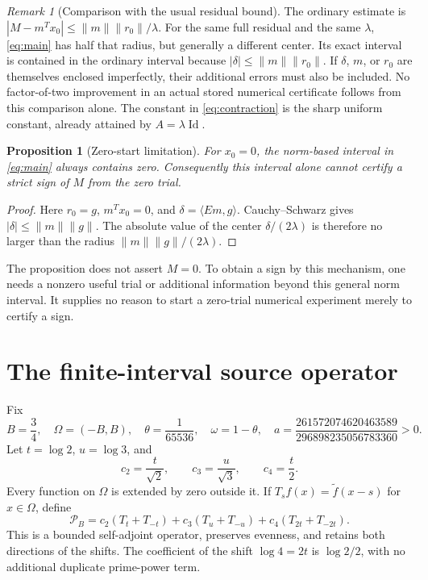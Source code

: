 \documentclass[11pt,a4paper]{article}
\newcommand{\Id}{\operatorname{Id}}
\newcommand{\ip}[2]{\langle #1,#2\rangle}
\newcommand{\norm}[1]{\lVert #1\rVert}
\newcommand{\Pp}{\mathcal P_B}
\newtheorem{proposition}[theorem]{Proposition}
\theoremstyle{remark}
\newtheorem{remark}[theorem]{Remark}
\numberwithin{equation}{section}
\begin{document}
\begin{remark}[Comparison with the usual residual bound]\label{rem:comparison}
The ordinary estimate is
$|M-m^Tx_0|\le\norm{m}\norm{r_0}/\lambda$.
For the same full residual and the same $\lambda$, \eqref{eq:main} has half
that radius, but generally a different center. Its exact interval is
contained in the ordinary interval because
$|\delta|\le\norm{m}\norm{r_0}$. If $\delta$, $m$, or $r_0$ are themselves
enclosed imperfectly, their additional errors must also be included. No
factor-of-two improvement in an actual stored numerical certificate follows
from this comparison alone. The constant in \eqref{eq:contraction} is the
sharp uniform constant, already attained by $A=\lambda\Id$.
\end{remark}

\begin{proposition}[Zero-start limitation]\label{prop:zero-start}
For $x_0=0$, the norm-based interval in \eqref{eq:main} always contains zero.
Consequently this interval alone cannot certify a strict sign of $M$ from
the zero trial.
\end{proposition}
\begin{proof}
Here $r_0=g$, $m^Tx_0=0$, and $\delta=\ip{Em}{g}$. Cauchy--Schwarz gives
$|\delta|\le\norm{m}\norm{g}$. The absolute value of the center
$\delta/(2\lambda)$ is therefore no larger than the radius
$\norm{m}\norm{g}/(2\lambda)$.
\end{proof}
The proposition does not assert $M=0$. To obtain a sign by this mechanism,
one needs a nonzero useful trial or additional information beyond this
general norm interval. It supplies no reason to start a zero-trial numerical
experiment merely to certify a sign.

\section{The finite-interval source operator}\label{sec:source}
Fix
\begin{equation}\label{eq:constants}
 B=\frac34,\quad \Omega=(-B,B),\quad
 \theta=\frac1{65536},\quad\omega=1-\theta,\quad
 a=\frac{261572074620463589}{296898235056783360}>0.
\end{equation}
Let $t=\log2$, $u=\log3$, and
\[
 c_2=\frac{t}{\sqrt2},\qquad c_3=\frac{u}{\sqrt3},\qquad c_4=\frac t2.
\]
Every function on $\Omega$ is extended by zero outside it. If
$T_s f(x)=\widetilde f(x-s)$ for $x\in\Omega$, define
\begin{equation}\label{eq:prime}
 \Pp=c_2(T_t+T_{-t})+c_3(T_u+T_{-u})
                  +c_4(T_{2t}+T_{-2t}).
\end{equation}
This is a bounded self-adjoint operator, preserves evenness, and retains
both directions of the shifts. The coefficient of the shift $\log4=2t$ is
$\log2/2$, with no additional duplicate prime-power term.
\end{document}
